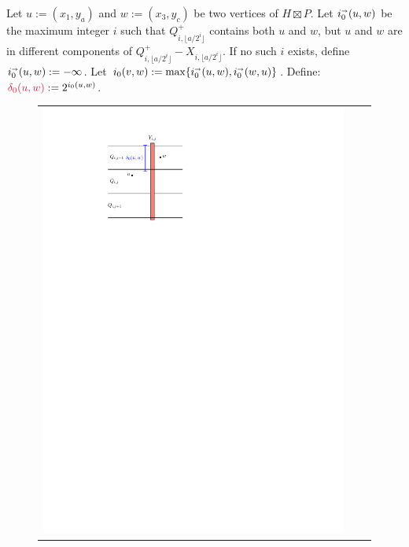 \documentclass{patmorin}
\makeatletter
\def\mathcolor#1#{\@mathcolor{#1}}
\def\@mathcolor#1#2#3{%
  \protect\leavevmode
  \begingroup
    \color#1{#2}#3%
  \endgroup
}
\newcommand{\mathdefin}[1]{\mathcolor{brightmaroon}{#1}}
\makeatother
\begin{document}
Let $u:=(x_1,y_a)$ and $w:=(x_3,y_c)$ be two vertices of $H\boxtimes P$.  Let $i_0^{\shortrightarrow}(u,w)$ be the maximum integer $i$ such that $Q^+_{i,\lfloor a/2^i\rfloor}$ contains both $u$ and $w$, but $u$ and $w$ are in different components of $Q^+_{i,\lfloor a/2^i\rfloor}-X_{i,\lfloor a/2^i\rfloor}$.  If no such $i$ exists, define $i_0^{\shortrightarrow}(u,w):=-\infty$.  Let $i_0(v,w):=\max\{i_0^{\shortrightarrow}(u,w),i_0^{\shortrightarrow}(w,u)\}$. Define: $\mathdefin{\delta_0(u,w)}:=2^{i_0(u,w)}$.
\begin{figure}
    \centering
    \begin{tabular}{ccc}
    \includegraphics[page=1,scale=0.85]{figs/new_metric} &

\end{tabular}
\end{figure}
\end{document}
